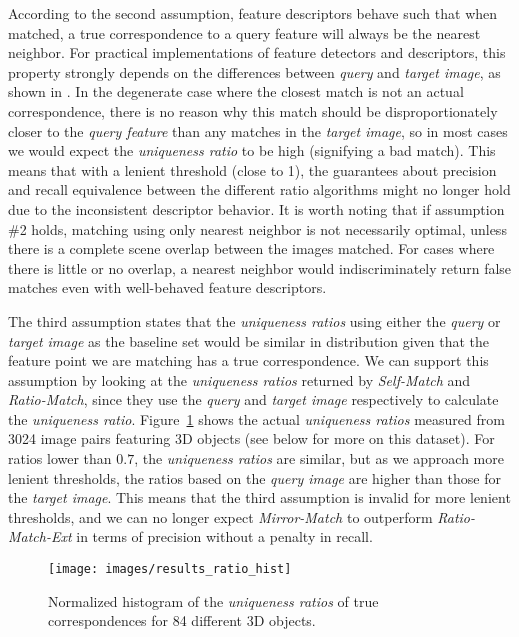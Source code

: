 \documentclass[10pt,journal,cspaper,compsoc]{IEEEtran}
\begin{document}
According to the second assumption, feature descriptors behave such that
when matched, a true correspondence to a query feature will always be 
the nearest neighbor. For practical implementations of feature detectors and descriptors, 
this property strongly depends on the differences between \emph{query} 
and \emph{target image}, as shown in  
\cite{mikolajczyk2005performance,tuytelaars2008local}. In the degenerate 
case where the closest match is not an actual correspondence, there is 
no reason why this match should be disproportionately closer to the 
\emph{query feature} than any matches in the \emph{target image}, so in 
most cases we would expect the \emph{uniqueness ratio} to be high 
(signifying a bad match). This means that with a lenient threshold (close 
to 1), the guarantees about precision and recall equivalence between the 
different ratio algorithms might no longer hold due to the inconsistent descriptor behavior. 
It is worth noting that if 
assumption \#2 holds, matching using only nearest neighbor is not 
necessarily optimal, unless there is a complete scene overlap between
the images matched. For cases where there is little or no overlap, a 
nearest neighbor would indiscriminately return false matches even with 
well-behaved feature descriptors.

The third assumption states that the \emph{uniqueness ratios} using either the 
\emph{query} or \emph{target image} as the baseline set would be similar
in distribution given that the feature point we are matching has a true 
correspondence. We can support this assumption by looking at the 
\emph{uniqueness ratios} returned by \emph{Self-Match} and 
\emph{Ratio-Match}, since they use the \emph{query} and 
\emph{target image} respectively to calculate the \emph{uniqueness ratio}.  
Figure~\ref{fig:ratio_hist} shows the actual \emph{uniqueness ratios} 
measured from 3024 image pairs featuring 3D objects (see below for more on this dataset).  
For ratios lower than $0.7$, the \emph{uniqueness ratios} are similar, but as we approach 
more lenient thresholds, the ratios based on the \emph{query image} are 
higher than those for the \emph{target image}. This means that the third assumption 
is invalid for more lenient thresholds, and we can no longer expect \emph{Mirror-Match} to outperform 
\emph{Ratio-Match-Ext} in terms of precision without a penalty in recall.


\begin{figure}[htb]
\centering
\texttt{[image: images/results\_ratio\_hist]}
\caption{Normalized histogram of the \emph{uniqueness ratios} of true 
correspondences for 84 different 3D objects.}
\label{fig:ratio_hist}
\end{figure}
\end{document}
